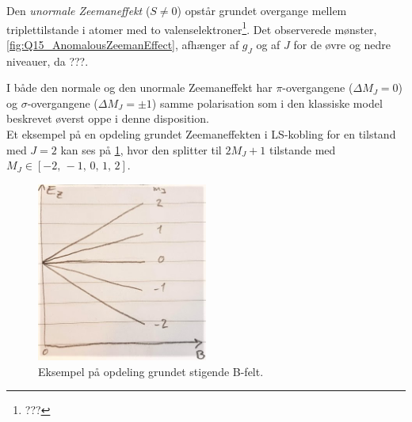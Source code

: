 Den \emph{unormale Zeemaneffekt} ($S \ne 0$) opstår grundet overgange mellem triplettilstande i atomer med to valenselektroner\footnote{???}. Det observerede mønster, \cref{fig:Q15_AnomalousZeemanEffect}, afhænger af $g_J$ og af $J$ for de øvre og nedre niveauer, da ???.

I både den normale og den unormale Zeemaneffekt har $\pi$-overgangene ($\Delta M_J = 0$) og $\sigma$-overgangene ($\Delta M_J = \pm 1$) samme polarisation som i den klassiske model beskrevet øverst oppe i denne disposition.\\


Et eksempel på en opdeling grundet Zeemaneffekten i LS-kobling for en tilstand med $J = 2$ kan ses på \cref{fig:Q15_ZeemanWithLSCouplingSplittings}, hvor den splitter til $2M_J + 1$ tilstande med $M_J \in [-2,\, -1,\, 0,\, 1,\, 2]$.

\begin{figure}[!h]
    \centering
    \includegraphics[width=0.5\textwidth]{Q15/images/ZeemanEffectWithLSCouplingSplitting.jpg}
    \caption{Eksempel på opdeling grundet stigende B-felt.}
    \label{fig:Q15_ZeemanWithLSCouplingSplittings}
\end{figure}